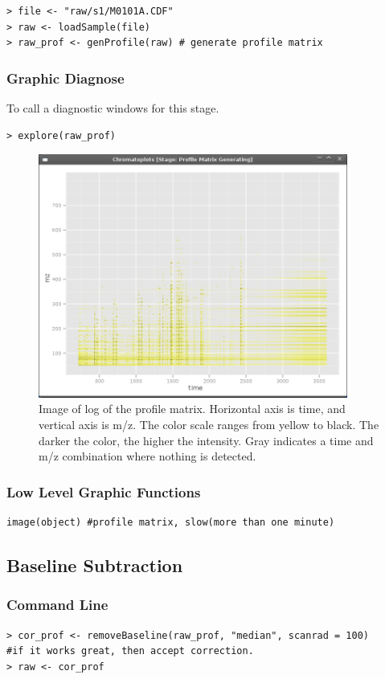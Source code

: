 \documentclass[11pt,a4paper]{article}
\begin{document}
\begin{verbatim}
> file <- "raw/s1/M0101A.CDF"
> raw <- loadSample(file)
> raw_prof <- genProfile(raw) # generate profile matrix
\end{verbatim}
\subsubsection*{Graphic Diagnose}
To call a diagnostic windows for this stage.
\begin{verbatim}
> explore(raw_prof)
\end{verbatim}
\begin{figure}[h!t!b!p]
\begin{center}
  \includegraphics[width=4in]{genprofile.png}
\caption{\label{fig:genprofile}Image of log of the profile
  matrix. Horizontal axis is time, and vertical axis is m/z. The color
  scale ranges from yellow to black. The darker the color, the higher
  the intensity. Gray indicates a time and m/z combination where
  nothing is detected.}
\end{center}
\end{figure}
\subsubsection*{Low Level Graphic Functions}
\begin{verbatim}
image(object) #profile matrix, slow(more than one minute)
\end{verbatim}

\subsection{Baseline Subtraction}
\subsubsection*{Command Line}
\begin{verbatim}
> cor_prof <- removeBaseline(raw_prof, "median", scanrad = 100)
#if it works great, then accept correction.
> raw <- cor_prof
\end{verbatim}
\end{document}
